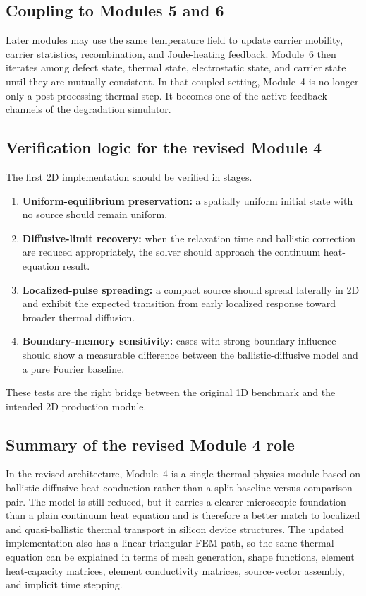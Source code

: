 \documentclass[11pt]{article}
\begin{document}
\subsection{Coupling to Modules 5 and 6}
Later modules may use the same temperature field to update carrier mobility, carrier statistics, recombination, and Joule-heating feedback. Module~6 then iterates among defect state, thermal state, electrostatic state, and carrier state until they are mutually consistent. In that coupled setting, Module~4 is no longer only a post-processing thermal step. It becomes one of the active feedback channels of the degradation simulator.

\subsection{Verification logic for the revised Module 4}
The first 2D implementation should be verified in stages.
\begin{enumerate}[leftmargin=1.6em]
    \item \textbf{Uniform-equilibrium preservation:} a spatially uniform initial state with no source should remain uniform.
    \item \textbf{Diffusive-limit recovery:} when the relaxation time and ballistic correction are reduced appropriately, the solver should approach the continuum heat-equation result.
    \item \textbf{Localized-pulse spreading:} a compact source should spread laterally in 2D and exhibit the expected transition from early localized response toward broader thermal diffusion.
    \item \textbf{Boundary-memory sensitivity:} cases with strong boundary influence should show a measurable difference between the ballistic-diffusive model and a pure Fourier baseline.
\end{enumerate}
These tests are the right bridge between the original 1D benchmark and the intended 2D production module.

\subsection{Summary of the revised Module 4 role}
In the revised architecture, Module~4 is a single thermal-physics module based on ballistic-diffusive heat conduction rather than a split baseline-versus-comparison pair. The model is still reduced, but it carries a clearer microscopic foundation than a plain continuum heat equation and is therefore a better match to localized and quasi-ballistic thermal transport in silicon device structures. The updated implementation also has a linear triangular FEM path, so the same thermal equation can be explained in terms of mesh generation, shape functions, element heat-capacity matrices, element conductivity matrices, source-vector assembly, and implicit time stepping.
\end{document}
